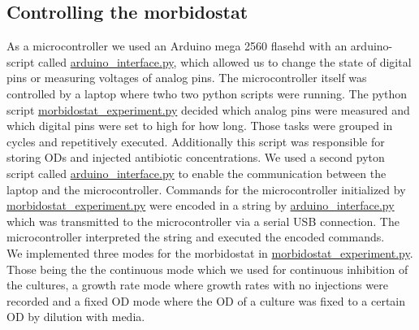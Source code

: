 \subsection{Controlling the morbidostat}
As a microcontroller we used an Arduino mega 2560 flasehd with an arduino-script called \href{https://github.com/nahanoo/ESBL\_project/}{arduino\_interface.py}, which allowed us to change the state of digital pins or measuring voltages of analog pins. The microcontroller itself was controlled by a laptop where twho two python scripts were running. The python script \href{https://github.com/nahanoo/ESBL\_project/}{morbidostat\_experiment.py} decided which analog pins were measured and which digital pins were set to high for how long. Those tasks were grouped in cycles and repetitively executed. Additionally this script was responsible for storing ODs and injected antibiotic concentrations. We used a second pyton script called \href{https://github.com/nahanoo/ESBL\_project/}{arduino\_interface.py} to enable the communication between the laptop and the microcontroller. Commands for the microcontroller initialized by \href{https://github.com/nahanoo/ESBL\_project/}{morbidostat\_experiment.py} were encoded in a string by \href{https://github.com/nahanoo/ESBL\_project/}{arduino\_interface.py} which was transmitted to the microcontroller via a serial USB connection. The microcontroller interpreted the string and executed the encoded commands. \\
We implemented three modes for the morbidostat in \href{https://github.com/nahanoo/ESBL\_project/}{morbidostat\_experiment.py}. Those being the the continuous mode which we used for continuous inhibition of the cultures, a growth rate mode where growth rates with no injections were recorded and a fixed OD mode where the OD of a culture was fixed to a certain OD by dilution with media. \\   

